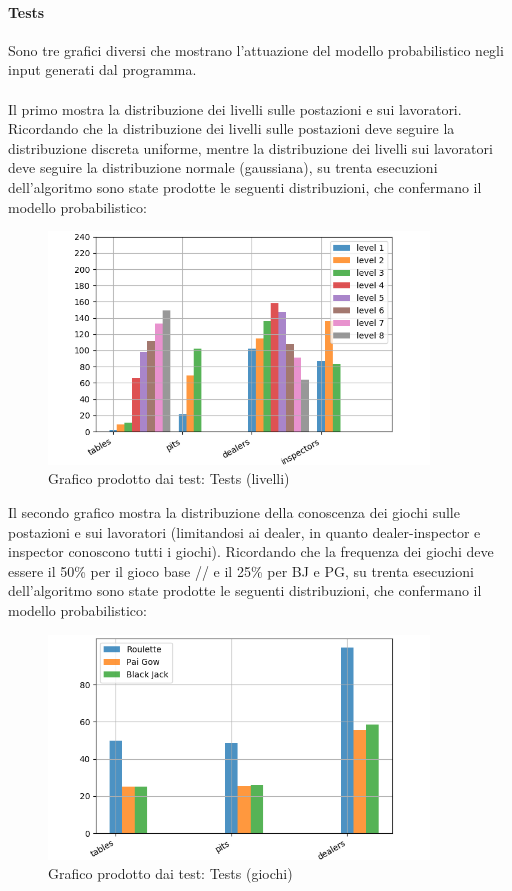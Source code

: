     \paragraph{Tests} Sono tre grafici diversi che mostrano l'attuazione del modello probabilistico negli input generati dal programma. \\
    \\ Il primo mostra la distribuzione dei livelli sulle postazioni e sui lavoratori. Ricordando che la distribuzione dei livelli sulle postazioni deve seguire la distribuzione discreta uniforme, mentre la distribuzione dei livelli sui lavoratori deve seguire la distribuzione normale (gaussiana), su trenta esecuzioni dell’algoritmo sono state prodotte le seguenti distribuzioni, che confermano il modello probabilistico:
    \begin{figure}[!h]
            \centering
            \includegraphics[width=0.9\textwidth,keepaspectratio]{../immagini/tests_levels.png}
            \caption{Grafico prodotto dai test: Tests (livelli)}
    \end{figure}
    \FloatBarrier
    \noindent
    Il secondo grafico mostra la distribuzione della conoscenza dei giochi sulle postazioni e sui lavoratori (limitandosi ai dealer, in quanto dealer-inspector e inspector conoscono tutti i giochi). Ricordando che la frequenza dei giochi deve essere il 50\% per il gioco base // e il 25\% per BJ e PG, su trenta esecuzioni dell’algoritmo sono state prodotte le seguenti distribuzioni, che confermano il modello probabilistico:
    \begin{figure}[!h]
            \centering
            \includegraphics[width=0.9\textwidth,keepaspectratio]{../immagini/tests_games.png}
            \caption{Grafico prodotto dai test: Tests (giochi)}
    \end{figure}
